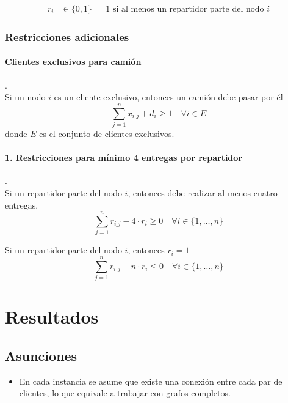 \documentclass{article}
\begin{document}
    \begin{align*}
        r_{i} &\in \{0,1\} && \text{1 si al menos un repartidor parte del nodo } i
    \end{align*}

    \subsubsection*{Restricciones adicionales}

     \paragraph{Clientes exclusivos para camión} . \\
    Si un nodo $i$ es un cliente exclusivo, entonces un camión debe pasar por él
    \[
    \sum_{j=1}^{n} x_{i\_j} + d_{i} \geq 1 \quad \forall i \in E
    \]
    donde $E$ es el conjunto de clientes exclusivos.
    \paragraph{1. Restricciones para mínimo 4 entregas por repartidor}.  \\

    Si un repartidor parte del nodo $i$, entonces debe realizar al menos cuatro entregas.
    \[
    \sum_{j=1}^{n} r_{i\_j} - 4 \cdot r_{i} \geq 0 \quad \forall i \in \{1, \dots, n\}
    \]

    Si un repartidor parte del nodo $i$, entonces $r_i = 1$
    \[
    \sum_{j=1}^{n} r_{i\_j} - n \cdot r_{i} \leq 0 \quad \forall i \in \{1, \dots, n\}
    \]

    \section{Resultados}

    \subsection{Asunciones}

    \begin{itemize}
        \item En cada instancia se asume que existe una conexión entre cada par de clientes, lo que equivale a trabajar con grafos completos.
    \end{itemize}
\end{document}
